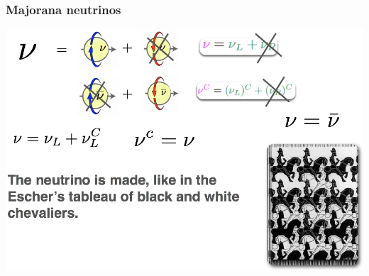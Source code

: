 \begin{frame}
\frametitle{Majorana neutrinos}
\includegraphics[scale=0.30]{img/MajoranaNeutrinosCartoon.png}
\end{frame}



